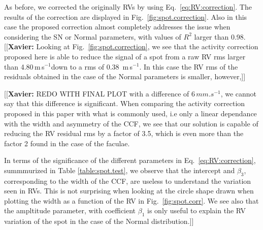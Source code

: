 \documentclass{aa}
\def\ms{\hbox{\,m\,s$^{-1}$}}         %
\newcommand{\xavier}[1]{{\color{blue}[[\textbf{Xavier: }#1]]}}
\begin{document}
As before, we corrected the originally RVs by using Eq.~\ref{eq:RV:correction}. The results of the correction are displayed in Fig.~\ref{fig:spot.correction}. Also in this case the proposed correction almost completely addresses the issue when considering the SN or Normal parameters, with values of $R^2$ larger than 0.98. \xavier{Looking at Fig.~\ref{fig:spot.correction}, we see that the activity correction proposed here is able to reduce the signal of a spot from a raw RV rms larger than 4.80\ms down to a rms of 0.38 \ms. In this case the RV rms of the residuals obtained in the case of the Normal parameters is smaller, however,} \xavier{REDO WITH FINAL PLOT with a difference of 6\,$mm.s^{-1}$, we cannot say that this difference is significant. When comparing the activity correction proposed in this paper with what is commonly used, i.e only a linear dependance with the width and asymmetry of the CCF, we see that our solution is capable of reducing the RV residual rms by a factor of 3.5, which is even more than the factor 2 found in the case of the faculae.

In terms of the significance of the different parameters in Eq.~\ref{eq:RV:correction}, summmurized in Table \ref{table:spot.test}, we observe that the intercept and $\beta_3$, corresponding to the width of the CCF, are useless to understand the variation seen in RVs. This is not surprising when looking at the circle shape drawn when plotting the width as a function of the RV in Fig.~\ref{fig:spot.corr}. We see also that the ampltitude parameter, with coefficient $\beta_1$ is only useful to explain the RV variation of the spot in the case of the Normal distribution.} 
\end{document}

